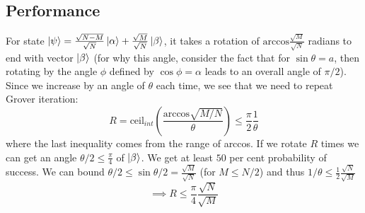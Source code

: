 \documentclass{article}
\begin{document}
\subsection{Performance}
For state $\ket{\psi} = \frac{\sqrt{N-M}}{\sqrt{N}}\ket{\alpha} + \frac{\sqrt{M}}{\sqrt{N}}\ket{\beta}$, it takes a rotation of $\text{arccos} \frac{\sqrt{M}}{\sqrt{N}}$ radians to end with vector $\ket{\beta}$ (for why this angle, consider the fact that for $\sin \theta = a$, then rotating by the angle $\phi$ defined by $\cos \phi = \alpha$ leads to an overall angle of $\pi/2$). Since we increase by an angle of $\theta$ each time, we see that we need to repeat Grover iteration:
$$R = \text{ceil}_{int} (\frac{\text{arccos} \sqrt{M/N}}{\theta}) \leq \frac{\pi}{2} \frac{1}{\theta}$$
where the last inequality comes from the range of arccos. If we rotate $R$ times we can get an angle $\theta/2 \leq \frac{\pi}{4}$ of $\ket{\beta}$. We get at least $50$ per cent probability of success. We can bound $\theta/2 \leq \sin \theta/2 = \frac{\sqrt{M}}{\sqrt{N}}$ (for $M \leq N/2$) and thus $1/\theta \leq \frac{1}{2}\frac{\sqrt{N}}{\sqrt{M}}$
$$\implies R \leq \frac{\pi}{4}\frac{\sqrt{N}}{\sqrt{M}}$$
\end{document}
